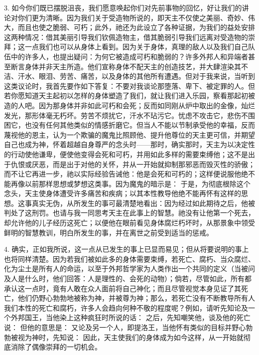 3. 如今你们既已摆脱沮丧，我们愿意唤起你们对先前事物的回忆，好让我们的讲论对你们更为清晰。因为我们关于受造物所说的，即天主不仅使之美丽、奇妙、伟大，而且也使之脆弱、可朽；此外，祂还为此设立了各种证据，为我们的益处安排这两种情况：借其美丽引导我们钦佩造物主，借其脆弱引导我们远离对受造物的崇拜；这一点我们也可以从身体上看到。因为关于身体，真理的敌人以及我们自己队伍中的许多人，也提出疑问：为何它被造成可朽和脆弱的？许多外邦人和异端者甚至断言身体并非天主所造。他们宣称身体不配天主的创造技艺，并大肆渲染其不洁、汗水、眼泪、劳苦、痛苦，以及身体的其他所有遭遇。但对于我来说，当听到这类议论时，我首先要作如下答复：不要对我谈论那堕落、卑下、被定罪的人。但若你愿知道天主起初以怎样的身体塑造了我们，就让我们进入乐园，察看那起初被造的人吧。因为那身体并非如此可朽和会死；反而如同刚从炉中取出的金像，灿烂发光，那形体毫无朽坏。劳苦不烦扰它，汗水不玷污它。忧虑不攻击它，悲伤不围困它，也没有任何其他类似的情感折磨它。但当人不能以节制承受他的幸福，反而蔑视他的恩主，认为一个欺骗的魔鬼比照顾他、提升他尊位的天主更可信，并期望自己也成为神，怀着超越自身尊严的念头时——那时，确实那时，天主为以决定性的行动使他谦卑，便使他变得会死和可朽，并用如此多样的需要束缚他；这不是出于仇恨或厌恶，而是出于对他的关怀，并从一开始就抑制那邪恶而毁灭性的骄傲；而不让它再进一步，祂以实际经验告诫他：他是会死和可朽的；这样便说服他绝不能再像以前那样思想或梦想这类事。因为魔鬼的暗示是：  于是，为彻底根除这个念头，天主使身体遭受许多痛苦和疾病；以其本性教导他绝不能再怀有这样的思想。这事真实无伪，从所发生的事可最清楚地看出：因为经过如此期待之后，他被判处了这刑罚。也请与我一同思考天主在此事上的智慧。祂没有让他第一个死去，却允许他的儿子经历这死亡；以便他在眼前看见身体腐烂朽坏时，从那景象中领受鲜明的智慧教训，明白所发生的事，并在离世之前受到适当的惩戒。\par

4. 确实，正如我所说，这一点从已发生的事上已显而易见；但从将要说明的事上也将同样清楚。因为若我们被如此多的身体需要束缚，若死亡、腐朽、当众腐烂、化为尘土是所有人的命运，以至于外邦哲学家为人类作出一个共同的定义（当被问及人是什么时，他们回答：人是理性的、会死的动物）；倘若，尽管如此，所有都承认这一点时，竟有人敢在众人面前将自己神化；而且尽管视觉本身见证了其死亡，他们仍野心勃勃地被称为神，并被尊为神；那么，若死亡没有不断教导所有人我们本性的死亡和腐朽，许多人会趋向何种不敬的程度呢？例如，请听先知论及一个外邦国王，当他染上这种疯狂时所说的话：  之后，先知嘲笑他，谈及他的死亡说：  但他的意思是： 又论及另一个人，即提洛王，当他怀有类似的目标并野心勃勃被视为神时，先知说：  因此，天主使我们的身体成为如今这样，从一开始就彻底消除了偶像崇拜的一切机会。\par

